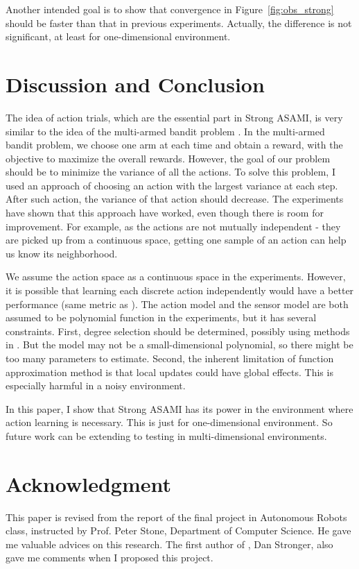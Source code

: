 \documentclass[12pt]{article}
\begin{document}
Another intended goal is to show that convergence in
Figure~\ref{fig:obs_strong} should be faster than that in previous
experiments. Actually, the difference is not significant, at least for
one-dimensional environment.

\section{Discussion and Conclusion}
\label{sec:dis}

The idea of action trials, which are the essential part in Strong
ASAMI, is very similar to the idea of the multi-armed bandit problem
\cite{vermorel2005multi}. In the multi-armed bandit problem, we choose
one arm at each time and obtain a reward, with the objective to
maximize the overall rewards. However, the goal of our problem should
be to minimize the variance of all the actions. To solve this problem,
I used an approach of choosing an action with the largest variance at
each step. After such action, the variance of that action should
decrease. The experiments have shown that this approach have worked, even
though there is room for improvement. For example, as the actions are
not mutually independent - they are picked up from a continuous space,
getting one sample of an action can help us know its neighborhood.

We assume the action space as a continuous space in the experiments.
However, it is possible that learning each discrete action independently would
have a better performance (same metric as
\cite{LNAI2007-ahmadi}). The action model and the sensor model are
both assumed to be polynomial function in the experiments, but it has
several constraints. First, degree selection should be
determined, possibly using methods in \cite{IJAIT08-stronger}. But the
model may not be a small-dimensional polynomial, so there might be
too many parameters to estimate. Second, the inherent limitation of
function approximation method is that local updates could have global
effects. This is especially harmful in a noisy environment.

In this paper, I show that Strong ASAMI has its power in the
environment where action learning is necessary. This is just for
one-dimensional environment. So future work can be extending to
testing in multi-dimensional environments.

\section{Acknowledgment}

This paper is revised from the report of the final project in
Autonomous Robots class,
instructed by Prof. Peter Stone, Department of Computer Science. He
gave me valuable advices on this research. The first author of
\cite{CSJ06}, Dan Stronger, also gave me comments when I proposed this
project.




\end{document}
